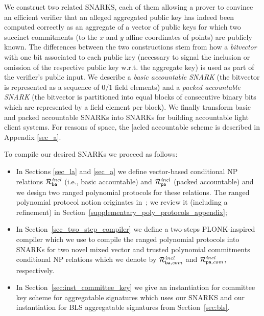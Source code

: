 \label{sec:snarks}

We construct two related SNARKS, each of them allowing a prover to convince an 
efficient verifier that an alleged aggregated public key has indeed been computed correctly as an aggregate 
of a vector of public keys for which two succinct commitments (to the $x$ and $y$ affine coordinates of points) are publicly known. The differences between the two  
constructions stem from how a \emph{bitvector} with one bit associated to each public key 
(necessary to signal the inclusion or omission of the respective public key w.r.t. the aggregate key) 
is used as part of the verifier's public input. We describe a 
\emph{basic accountable SNARK} (the bitvector is represented as a sequence of $0/1$ field elements) and a \emph{packed accountable SNARK} (the bitvector is 
partitioned into equal blocks of consecutive binary bits which are represented by a field element per block). 
We finally transform basic and packed accountable SNARKs into SNARKs for building accountable light client systems. For reasons of space, the [acled accountable scheme is described in Appendix \ref{sec_a}.

\noindent To compile our desired SNARKs we proceed as follows:
\begin{itemize}
\item In Sections \ref{sec_la} and \ref{sec_a} we define vector-based conditional NP relations $\mathcal{R}^{\mathit{incl}}_{\mathsf{ba}}$ (i.e., basic accountable) and $\mathcal{R}^{\mathit{incl}}_{\mathsf{pa}}$ (packed accountable) and we design two ranged polynomial protocols for these relations. The ranged polynomial protocol notion originates in~\cite{plonk}; 
we review it (including a refinement) in Section~\ref{supplementary_poly_protocols_appendix};  
\item In Section~\ref{sec_two_step_compiler} we define a two-steps PLONK-inspired compiler which we use to compile the ranged polynomial protocols into 
SNARKs for two novel mixed vector and trusted polynomial commitments conditional NP relations which we denote by 
$\mathcal{R}^{\mathit{incl}}_{\mathsf{ba},\mathit{com}}$ and $\mathcal{R}^{\mathit{incl}}_{\mathsf{pa},\mathit{com}}$, respectively. 
\item In Section~\ref{sec:inst_committee_key} we give an instantiation for committee key scheme for aggregatable signatures which uses our SNARKS 
 and our instantiation for BLS aggregatable signatures from Section~\ref{sec:bls}. 
\end{itemize}

